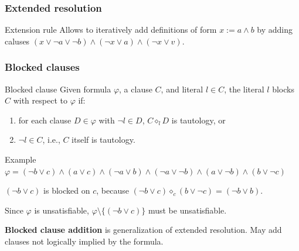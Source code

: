 \documentclass[xcolor=dvipsnames]{beamer}
\begin{document}
\begin{frame}
	\frametitle{Extended resolution}
    \begin{block}{Extension rule}
        Allows to iteratively add definitions of form $x := a \wedge b$ by adding caluses
        $(x \vee \neg a \vee \neg b) \wedge (\neg x \vee a) \wedge (\neg x \vee v)$.
    \end{block}


\end{frame}

\begin{frame}[t]
    \frametitle{Blocked clauses}

    \begin{block}{Blocked clause}
        Given formula $\varphi$, a clause $C$, and literal $l \in C$, the literal $l$
        blocks $C$ with respect to $\varphi$ if:
        \begin{enumerate}
            \item for each clause $D \in \varphi$ with $\neg l \in D$, $C \diamond_l D$
                  is tautology, or
            \item $\neg l \in C$, i.e., $C$ itself is tautology.
        \end{enumerate}
    \end{block}

    \pause
    \begin{block}{Example}
    $\varphi = (\neg b \vee c) \wedge (a \vee c) \wedge
                  (\neg a \vee b) \wedge (\neg a \vee \neg b) \wedge
                  (a \vee \neg b) \wedge (b \vee \neg c)
    $

    \bigskip
    $(\neg b \vee c)$ is blocked on $c$, because $(\neg b \vee c)
    \diamond_c (b \vee \neg c) = (\neg b \vee b)$.

    \bigskip
    Since $\varphi$ is unsatisfiable, $\varphi \setminus
    \{(\neg b \vee c)\}$ must be unsatisfiable.
    \end{block}

    \pause
    \textbf{Blocked clause addition} is generalization of extended resolution. May add clauses not logically implied by the formula.
\end{frame}
\end{document}
